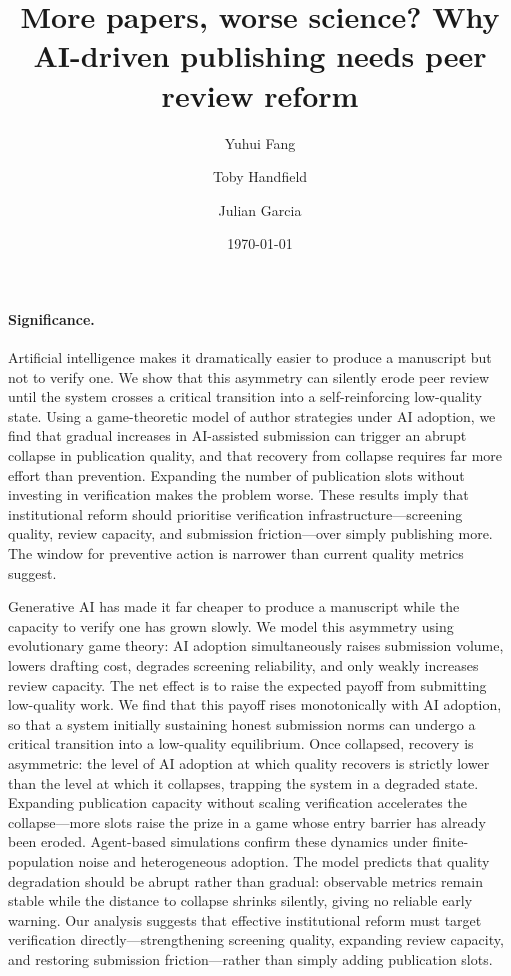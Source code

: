 \documentclass{article}
\author{Yuhui Fang \and Toby Handfield \and Julian Garcia}
\title{More papers, worse science? Why AI-driven publishing needs peer review reform}
\date{\today}
\makeatletter
\renewenvironment{abstract}{%
  \small
  \begin{center}%
    {\bfseries\abstractname\vspace{-.5em}\vspace{\z@}}%
  \end{center}%
  \setlength{\parindent}{0pt}%
  \setlength{\parskip}{0.8em}%
  \noindent\ignorespaces
}{%
  \par%
}
\makeatother
\begin{document}
\linenumbers  %

\maketitle

\paragraph{Significance.}
Artificial intelligence makes it dramatically easier to produce a manuscript but not to verify one.
We show that this asymmetry can silently erode peer review until the system crosses a critical transition into a self-reinforcing low-quality state.
Using a game-theoretic model of author strategies under AI adoption, we find that gradual increases in AI-assisted submission can trigger an abrupt collapse in publication quality, and that recovery from collapse requires far more effort than prevention.
Expanding the number of publication slots without investing in verification makes the problem worse.
These results imply that institutional reform should prioritise verification infrastructure---screening quality, review capacity, and submission friction---over simply publishing more.
The window for preventive action is narrower than current quality metrics suggest.

\begin{abstract}
Generative AI has made it far cheaper to produce a manuscript while the capacity to verify one has grown slowly.
We model this asymmetry using evolutionary game theory: AI adoption simultaneously raises submission volume, lowers drafting cost, degrades screening reliability, and only weakly increases review capacity.
The net effect is to raise the expected payoff from submitting low-quality work.
We find that this payoff rises monotonically with AI adoption, so that a system initially sustaining honest submission norms can undergo a critical transition into a low-quality equilibrium.
Once collapsed, recovery is asymmetric: the level of AI adoption at which quality recovers is strictly lower than the level at which it collapses, trapping the system in a degraded state.
Expanding publication capacity without scaling verification accelerates the collapse---more slots raise the prize in a game whose entry barrier has already been eroded.
Agent-based simulations confirm these dynamics under finite-population noise and heterogeneous adoption.
The model predicts that quality degradation should be abrupt rather than gradual: observable metrics remain stable while the distance to collapse shrinks silently, giving no reliable early warning.
Our analysis suggests that effective institutional reform must target verification directly---strengthening screening quality, expanding review capacity, and restoring submission friction---rather than simply adding publication slots.
\end{abstract}
\end{document}
